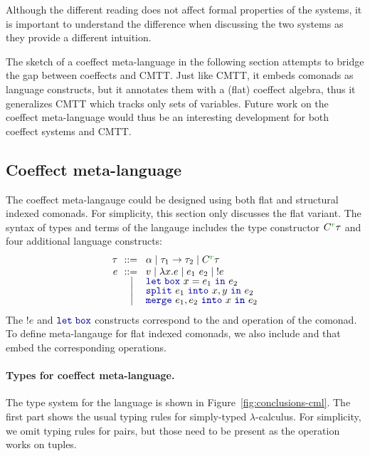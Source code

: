 \noindent
Although the different reading does not affect formal properties of the systems, it is important
to understand the difference when discussing the two systems as they provide a different 
intuition.

The sketch of a coeffect meta-language in the following section attempts to bridge the gap
between coeffects and CMTT. Just like CMTT, it embeds comonads as language constructs, but
it annotates them with a (flat) coeffect algebra, thus it generalizes CMTT which tracks only
sets of variables. Future work on the coeffect meta-language would thus be an interesting 
development for both coeffect systems and CMTT.


\subsection{Coeffect meta-language}

The coeffect meta-langauge could be designed using both flat and structural indexed comonads.
For simplicity, this section only discusses the flat variant. The syntax of types and terms
of the langauge includes the type constructor $\ctyp{\cclrd{r}}{\tau}$ and four additional
language constructs:
%
\begin{equation*}
\begin{array}{rcl}
 \tau &\narrow{::=}& \alpha \sep \tau_1 \rightarrow \tau_2 \sep \ctyp{\cclrd{r}}{\tau}\\
 e &\narrow{::=}& v \sep \lambda x.e \sep e_1~e_2 \sep !e    \\[-0.25em]
  &        \sep& \kvd{let\;box}~x=e_1~\kvd{in}~e_2           \\[-0.25em]
  &        \sep& \kvd{split}~e_1~\kvd{into}~x,y~\kvd{in}~e_2 \\[-0.25em]
  &        \sep& \kvd{merge}~e_1, e_2~\kvd{into}~x~\kvd{in}~e_2 
\end{array}
\end{equation*}
%
The $!e$ and $\kvd{let\;box}$ constructs correspond to the  and 
operation of the comonad. To define meta-langauge for flat indexed comonads, we also include 
 and  that embed the corresponding operations. 

\paragraph{Types for coeffect meta-language.}
The type system for the language is shown in Figure~\ref{fig:conclusions-cml}. The first part
shows the usual typing rules for simply-typed $\lambda$-calculus. For simplicity, we omit typing 
rules for pairs, but those need to be present as the  operation works on tuples.

